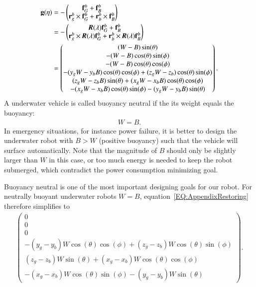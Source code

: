 \begin{align}
\vec{g}(\vec{\eta})&=
-\begin{pmatrix}
\vec{f}_{G}^{b}+\vec{f}_{B}^{b}\\
\vec{r}_{g}^{b}\times \vec{f}_{G}^{b}+\vec{r}_{b}^{b}\times \vec{f}_{B}^{b}
\end{pmatrix} \nonumber \\
&=
-\begin{pmatrix}
\emph{\textbf{R}}(\vec{\lambda})\vec{f}_{G}^{b}+\vec{f}_{B}^{b}\\
\vec{r}_{g}^{b}\times \emph{\textbf{R}}(\vec{\lambda})\vec{f}_{G}^{b}+\vec{r}_{b}^{b}\times \emph{\textbf{R}}(\vec{\lambda}) \vec{f}_{B}^{b}
\end{pmatrix} \nonumber \\
&=
\begin{pmatrix}
(W-B)\sin(\theta) \\
-(W-B)\cos(\theta)\sin(\phi) \\
-(W-B)\cos(\theta)\cos(\phi) \\
-(y_{g}W-y_{b}B)\cos(\theta)\cos(\phi)+(z_{g}W-z_{b})\cos(\theta)\sin(\phi) \\
(z_{g}W-z_{b}B)\sin(\theta)+(x_{g}W-x_{b}B)\cos(\theta)\cos(\phi) \\
-(x_{g}W-x_{b}B)\cos(\theta)\sin(\phi)-(y_{g}W-y_{b}B)\sin(\theta)
\end{pmatrix}.\label{EQ:AppendixRestoring}
\end{align}
A underwater vehicle is called buoyancy neutral if the its weight equals the buoyancy:
\begin{align}
W=B.
\end{align}
In emergency situations, for instance power failure, it is better to design the underwater robot with $B > W$ (positive buoyancy) such that the vehicle will surface automatically. Note that the magnitude of $B$ should only be slightly larger than $W$ in this case, or too much energy is needed to keep the robot submerged, which contradict the power consumption minimizing goal.

Buoyancy neutral is one of the most important designing goals for our robot. For neutrally buoyant underwater robots $W=B$, equation~\ref{EQ:AppendixRestoring} therefore simplifies to
\begin{align}
\begin{pmatrix}
0 \\ 0 \\ 0
\\ -(y_{g}-y_{b})W\cos(\theta)\cos(\phi)+(z_{g}-z_{b})W\cos(\theta)\sin(\phi)\\
(z_{g}-z_{b})W\sin(\theta)+(x_{g}-x_{b})W \cos(\theta)\cos(\phi) \\
-(x_{g}-x_{b})W \cos(\theta)\sin(\phi)-(y_{g}-y_{b})W \sin(\theta)
\end{pmatrix}.\label{EQ:AppendixRestoringBN}
\end{align}
